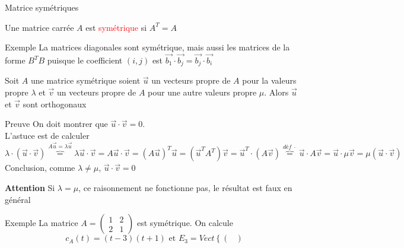         \begin{parag}{Matrice symétriques}
            \begin{definition}
                Une matrice carrée $A$ est \textcolor{red}{symétrique} si $A^T = A$
            \end{definition}
            \begin{subparag}{Exemple}
                La matrices diagonales sont symétrique, mais aussi les matrices de la forme $B^TB$ puisque le coefficient $(i, j)$ est $\vec{b_1}\cdot\vec{b_j} = \vec{b_j}\cdot \vec{b_i}$
            \end{subparag}
            \begin{theoreme}
                Soit $A$ une matrice symétrique soient $\vec{u}$ un vecteurs propre de $A$ pour la valeurs propre $\lambda$ et $\vec{v}$ un vecteurs propre de $A$ pour une autre valeurs propre $\mu$. Alors $\vec{u}$ et $\vec{v}$ sont orthogonaux
            \end{theoreme}
            \begin{subparag}{Preuve}
                On doit montrer que $\vec{u}\cdot \vec{v} = 0$.
                \\
                L'astuce est de calculer $\lambda\cdot(\vec{u}\cdot\vec{v}) \overbrace{=}^{A\vec{u} = \lambda\vec{u}} \lambda \vec{u}\cdot\vec{v} = A\vec{u}\cdot\vec{v} = (A\vec{u})^T\vec{u} = (\vec{u}^TA^T)\vec{v} = \vec{u}^T\cdot(A\vec{v}) \overbrace{=}^{déf \; \cdot} \vec{u}\cdot A\vec{v} = \vec{u}\cdot\mu\vec{v} = \mu(\vec{u}\cdot\vec{v})$ 
                \\
                Conclusion, comme $\lambda \neq \mu$, $\vec{u}\cdot\vec{v} = 0$
                \\
                \begin{framedremark}
                    \textbf{Attention}
                Si $\lambda = \mu$, ce raisonnement ne fonctionne pas, le résultat est faux en général
                \end{framedremark}
            \end{subparag}
            \begin{subparag}{Exemple}
                La matrice $A = \begin{pmatrix}
                    1 & 2\\
                    2 & 1
                \end{pmatrix}$ est symétrique. On calcule
                \[c_A(t) = (t-3)(t+1) \text{ et } E_3 = Vect\left\{\begin{pmatrix}

\end{pmatrix}\]
\end{subparag}
\end{parag}
